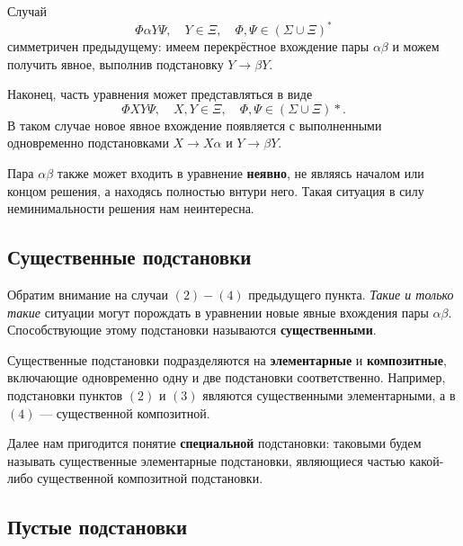 \documentclass[12pt]{article}
\begin{document}
Случай
\begin{equation}
  \Phi \alpha Y \Psi, \quad Y \in \Xi, \quad \Phi, \Psi \in (\Sigma \cup \Xi)^*
\end{equation}
симметричен предыдущему: имеем перекрёстное вхождение пары $\alpha \beta$ и
можем получить явное, выполнив подстановку $Y \to \beta Y$.

Наконец, часть уравнения может представляться в виде
\begin{equation}
  \Phi X Y \Psi, \quad X, Y \in \Xi, \quad \Phi, \Psi \in (\Sigma \cup \Xi)*.
\end{equation}
В таком случае новое явное вхождение появляется с выполненными одновременно
подстановками $X \to X \alpha$ и $Y \to \beta Y$.

Пара $\alpha \beta$ также может входить в уравнение \textbf{неявно}, не являясь
началом или концом решения, а находясь полностью внтури него. Такая
ситуация в силу неминимальности решения нам неинтересна.

\subsection{Существенные подстановки}

Обратим внимание на случаи $(2)-(4)$ предыдущего пункта. \textit{Такие и только
такие} ситуации могут порождать в уравнении новые явные вхождения пары
$\alpha \beta$. Способствующие этому подстановки называются
\textbf{существенными}.

Существенные подстановки подразделяются на \textbf{элементарные} и
\textbf{композитные}, включающие одновременно одну и две подстановки
соответственно. Например, подстановки пунктов $(2)$ и $(3)$ являются
существенными элементарными, а в $(4)$ --- существенной композитной.

Далее нам пригодится понятие \textbf{специальной} подстановки: таковыми будем
называть существенные элементарные подстановки, являющиеся частью какой-либо
существенной композитной подстановки.

\subsection{Пустые подстановки}
\end{document}
